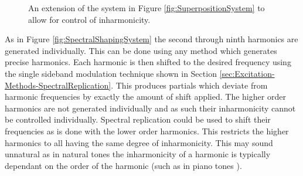 \begin{figure}[h!]
			\caption{An extension of the system in Figure \ref{fig:SuperpositionSystem} to allow for control
			         of inharmonicity.}
			\label{fig:InharmonicitySystem}
		\end{figure}

		As in Figure \ref{fig:SpectralShapingSystem} the second through ninth harmonics are generated individually.
		This can be done using any method which generates precise harmonics. Each harmonic is then shifted to the
		desired frequency using the single sideband modulation technique shown in Section
		\ref{sec:Excitation-Methods-SpectralReplication}. This produces partials which deviate from harmonic
		frequencies by exactly the amount of shift applied. The higher order harmonics are not generated
		individually and as such their inharmonicity cannot be controlled individually. Spectral replication could
		be used to shift their frequencies as is done with the lower order harmonics. This restricts the higher
		harmonics to all having the same degree of inharmonicity.  This may sound unnatural as in natural tones the
		inharmonicity of a harmonic is typically dependant on the order of the harmonic (such as in piano tones
		\citep{young1952inharmonicity}).

